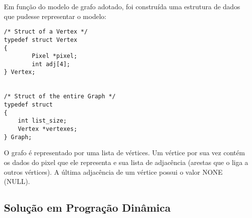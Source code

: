 Em função do modelo de grafo adotado, foi construída uma estrutura de dados
que pudesse representar o modelo: 

\begin{lstlisting}
/* Struct of a Vertex */
typedef struct Vertex
{
        Pixel *pixel;
        int adj[4];
} Vertex;


/* Struct of the entire Graph */
typedef struct
{
    int list_size;
    Vertex *vertexes;
} Graph;
\end{lstlisting}

O grafo é representado por uma lista de vértices. 
Um vértice por sua vez contém os dados do pixel que ele representa e sua 
lista de adjacência (arestas que o liga a outros vértices).
A última adjacência de um vértice possui o valor NONE (NULL). 




\subsection{Solução em Progração Dinâmica}
